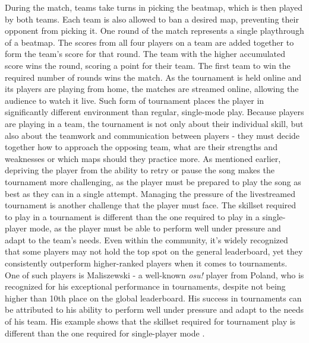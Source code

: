 During the match, teams take turns in picking the beatmap, which is then played by both teams. Each team is also allowed to ban a desired map, preventing their opponent from picking it. One round of the match represents a single playthrough of a beatmap. The scores from all four players on a team are added together to form the team’s score for that round. The team with the higher accumulated score wins the round, scoring a point for their team. The first team to win the required number of rounds wins the match. As the tournament is held online and its players are playing from home, the matches are streamed online, allowing the audience to watch it live.
Such form of tournament places the player in significantly different environment than regular, single-mode play. Because players are playing in a team, the tournament is not only about their individual skill, but also about the teamwork and communication between players - they must decide together how to approach the opposing team, what are their strengths and weaknesses or which maps should they practice more. As mentioned earlier, depriving the player from the ability to retry or pause the song makes the tournament more challenging, as the player must be prepared to play the song as best as they can in a single attempt. Managing the pressure of the livestreamed tournament is another challenge that the player must face. The skillset required to play in a tournament is different than the one required to play in a single-player mode, as the player must be able to perform well under pressure and adapt to the team’s needs. Even within the community, it's widely recognized that some players may not hold the top spot on the general leaderboard, yet they consistently outperform higher-ranked players when it comes to tournaments. One of such players is Maliszewski - a well-known \textit{osu!} player from Poland, who is recognized for his exceptional performance in tournaments, despite not being higher than 10th place on the global leaderboard. His success in tournaments can be attributed to his ability to perform well under pressure and adapt to the needs of his team. His example shows that the skillset required for tournament play is different than the one required for single-player mode \cite{maliszewski}.

